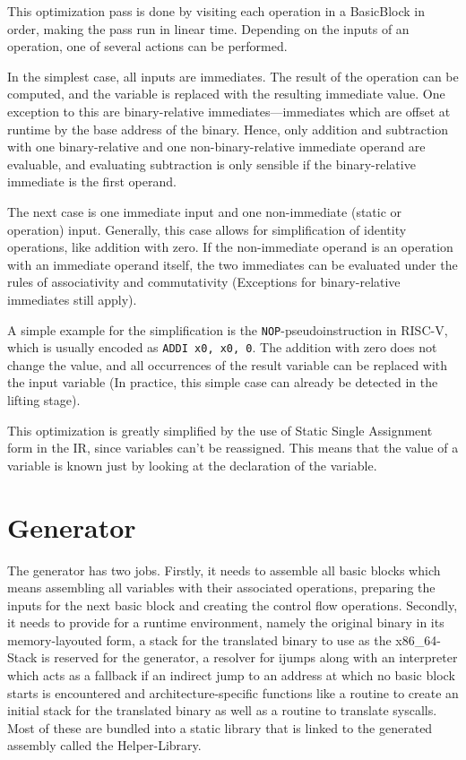 \documentclass[course=eragp]{aspdoc}
\begin{document}
This optimization pass is done by visiting each operation in a BasicBlock in order, making the pass run in linear time.
Depending on the inputs of an operation, one of several actions can be performed.

In the simplest case, all inputs are immediates. The result of the operation can be computed, and the variable is
replaced with the resulting immediate value. One exception to this are binary-relative immediates---immediates which are
offset at runtime by the base address of the binary. Hence, only addition and subtraction with one binary-relative and
one non-binary-relative immediate operand are evaluable, and evaluating subtraction is only sensible if the
binary-relative immediate is the first operand.

The next case is one immediate input and one non-immediate (static or operation) input. Generally, this case allows for
simplification of identity operations, like addition with zero. If the non-immediate operand is an operation with an
immediate operand itself, the two immediates can be evaluated under the rules of associativity and commutativity
(Exceptions for binary-relative immediates still apply).

A simple example for the simplification is the \texttt{NOP}-pseudoinstruction in RISC-V, which is usually encoded as
\texttt{ADDI x0, x0, 0}.\cite[p.~20]{rvspec} The addition with zero does not change the value, and all occurrences of
the result variable can be replaced with the input variable (In practice, this simple case can already be detected in
the lifting stage).

This optimization is greatly simplified by the use of Static Single Assignment form in the IR, since variables can't be
reassigned. This means that the value of a variable is known just by looking at the declaration of the variable.

\clearpage

\section{Generator}
The generator has two jobs. %
Firstly, it needs to assemble all basic blocks which means assembling all variables with their associated operations,
preparing the inputs for the next basic block and creating the control flow operations.
Secondly, it needs to provide for a runtime environment, namely the original binary in its memory-layouted
form, a stack for the translated binary to use as the x86\_64-Stack is reserved for the generator, a resolver for ijumps
along with an interpreter which acts as a fallback if an indirect jump to an address at which no basic block starts is encountered
and architecture-specific functions like a routine to create an initial stack for the translated binary as well as a routine to translate syscalls.
Most of these are bundled into a static library that is linked to the generated assembly called the Helper-Library.
\end{document}
